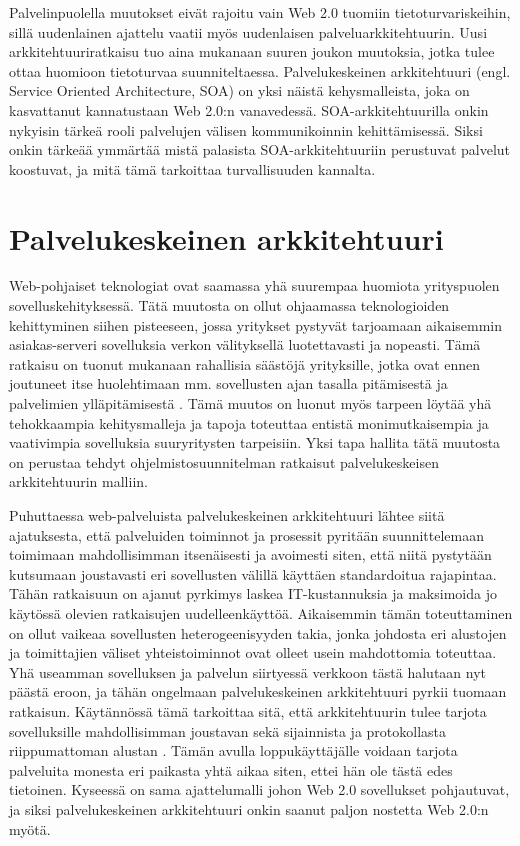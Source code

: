 Palvelinpuolella muutokset eivät rajoitu vain Web 2.0 tuomiin
tietoturvariskeihin, sillä uudenlainen ajattelu vaatii myös uudenlaisen
palveluarkkitehtuurin. Uusi arkkitehtuuriratkaisu tuo aina mukanaan suuren
joukon muutoksia, jotka tulee ottaa huomioon tietoturvaa suunniteltaessa.
Palvelukeskeinen arkkitehtuuri (engl. Service Oriented Architecture, SOA) on
yksi näistä kehysmalleista, joka on kasvattanut kannatustaan Web 2.0:n
vanavedessä. SOA-arkkitehtuurilla onkin nykyisin tärkeä rooli palvelujen
välisen kommunikoinnin kehittämisessä. Siksi onkin tärkeää ymmärtää mistä
palasista SOA-arkkitehtuuriin perustuvat palvelut koostuvat, ja mitä tämä
tarkoittaa turvallisuuden kannalta.

\section{Palvelukeskeinen arkkitehtuuri}

Web-pohjaiset teknologiat ovat saamassa yhä suurempaa huomiota yrityspuolen
sovelluskehityksessä. Tätä muutosta on ollut ohjaamassa teknologioiden
kehittyminen siihen pisteeseen, jossa yritykset pystyvät tarjoamaan aikaisemmin
asiakas-serveri sovelluksia verkon välityksellä luotettavasti ja nopeasti. Tämä
ratkaisu on tuonut mukanaan rahallisia säästöjä yrityksille, jotka ovat ennen
joutuneet itse huolehtimaan mm. sovellusten ajan tasalla pitämisestä ja
palvelimien ylläpitämisestä \cite{WEB2}. Tämä muutos on luonut myös tarpeen löytää yhä
tehokkaampia kehitysmalleja ja tapoja toteuttaa entistä monimutkaisempia ja
vaativimpia sovelluksia suuryritysten tarpeisiin. Yksi tapa hallita tätä
muutosta on perustaa tehdyt ohjelmistosuunnitelman ratkaisut palvelukeskeisen
arkkitehtuurin malliin.

Puhuttaessa web-palveluista palvelukeskeinen arkkitehtuuri lähtee siitä
ajatuksesta, että palveluiden toiminnot ja prosessit pyritään suunnittelemaan
toimimaan mahdollisimman itsenäisesti ja avoimesti siten, että niitä pystytään
kutsumaan joustavasti eri sovellusten välillä käyttäen standardoitua rajapintaa.
Tähän ratkaisuun on ajanut pyrkimys laskea IT-kustannuksia ja maksimoida jo
käytössä olevien ratkaisujen uudelleenkäyttöä. Aikaisemmin tämän toteuttaminen
on ollut vaikeaa sovellusten heterogeenisyyden takia, jonka johdosta eri
alustojen ja toimittajien väliset yhteistoiminnot ovat olleet usein mahdottomia
toteuttaa. Yhä useamman sovelluksen ja palvelun siirtyessä verkkoon tästä
halutaan nyt päästä eroon, ja tähän ongelmaan palvelukeskeinen arkkitehtuuri
pyrkii tuomaan ratkaisun. Käytännössä tämä tarkoittaa sitä, että arkkitehtuurin
tulee tarjota sovelluksille mahdollisimman joustavan sekä sijainnista ja
protokollasta riippumattoman alustan \cite{SOA}. Tämän avulla loppukäyttäjälle
voidaan tarjota palveluita monesta eri paikasta yhtä aikaa siten, ettei hän ole
tästä edes tietoinen. Kyseessä on sama ajattelumalli johon Web 2.0 sovellukset
pohjautuvat, ja siksi palvelukeskeinen arkkitehtuuri onkin saanut paljon
nostetta Web 2.0:n myötä.

